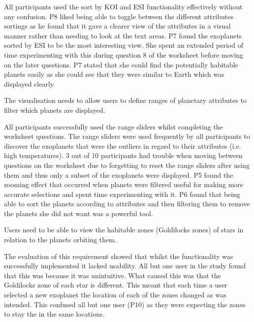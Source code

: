 \begin{enumerate}
All participants used the sort by KOI and ESI functionality effectively without
any confusion. P8 liked being able to toggle between the different attributes
sortings as he found that it gave a clearer view of the attributes in a visual
manner rather than needing to look at the text areas.
P7 found the exoplanets sorted by ESI to be the most interesting view. She
spent an extended period of time experimenting with this during question 8 of
the
worksheet before moving on the later questions. P7 stated that she could find
the potentially habitable planets easily as she could see that they were similar
to Earth which was displayed clearly.

{\bf \item[R4.] The visualisation needs to allow users to define ranges of
planetary attributes to filter which planets are displayed.}

All participants successfully used the range sliders whilst completing the
worksheet questions. The range sliders were used frequently by all participants
to discover the
exoplanets that were the outliers in regard to their attributes (i.e. high
temperatures). 3 out of 10 participants had trouble when moving between
questions on the worksheet due to forgetting
to reset the range sliders after using them and thus only a subset of the
exoplanets were displayed. 
P5 found the zooming effect that occurred when planets were filtered useful for
making more accurate selections and spent time
experimenting with it. P6 found that being able to sort the planets according to
attributes and
then filtering them to remove the planets she did not want was a powerful tool.

{\bf \item[R5.] Users need to be able to view the habitable zones (Goldilocks
zones) of stars in
relation to the planets orbiting them.}

The evaluation of this requirement showed that whilst the functionality was
successfully implemented it lacked usability. All but one user in the study
found that this was because it was unintuitive. What caused this was that the
Goldilocks zone of each star is different. This meant that each time a user
selected a new exoplanet the location of each of the zones changed as was
intended. This confused all but one user (P10) as they were expecting the
zones to stay the in the same locations.  

\end{enumerate}

